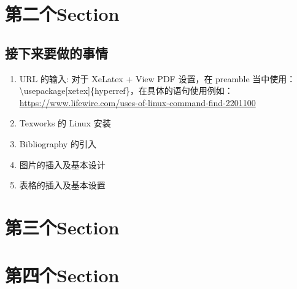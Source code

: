 \documentclass[UTF8,fancyhdr,a4paper]{ctexart}
\begin{document}
\newpage
\section{第二个Section}

\subsection{接下来要做的事情}
\begin{enumerate}
\item
URL 的输入: 对于 XeLatex + View PDF 设置，在 preamble 当中使用：\\
\textbackslash usepackage[xetex]\{hyperref\}，在具体的语句使用例如：\\ \url{https://www.lifewire.com/uses-of-linux-command-find-2201100}
\item
Texworks 的 Linux 安装
\item
Bibliography 的引入
\item
图片的插入及基本设计
\item
表格的插入及基本设置



\end{enumerate}

\newpage
\section{第三个Section}

\newpage
\section{第四个Section}
\end{document}
